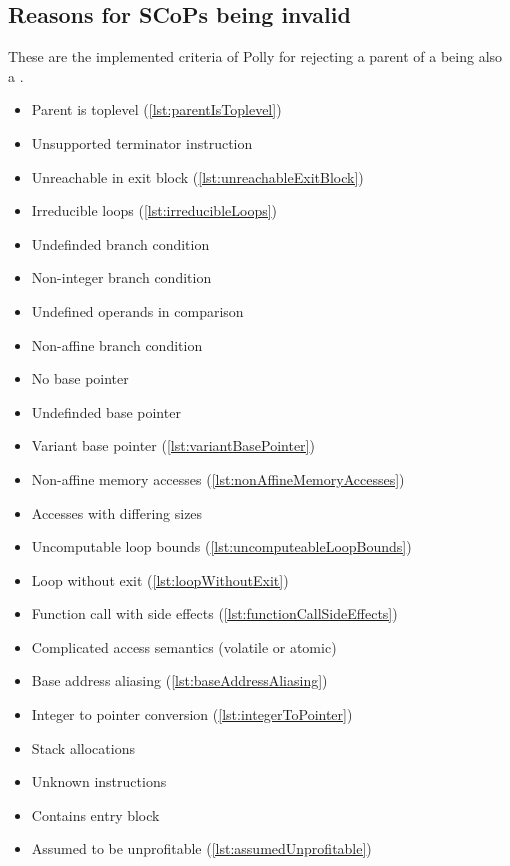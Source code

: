 \subsection{Reasons for SCoPs being invalid}
These are the implemented criteria of Polly for rejecting a parent of a \scop being also a \scop.
\begin{itemize}
    \item Parent is toplevel (\autoref{lst:parentIsToplevel})
    \item Unsupported terminator instruction
    \item Unreachable in exit block (\autoref{lst:unreachableExitBlock})
    \item Irreducible loops (\autoref{lst:irreducibleLoops})
    \item Undefinded branch condition
    \item Non-integer branch condition
    \item Undefined operands in comparison
    \item Non-affine branch condition
    \item No base pointer
    \item Undefinded base pointer
    \item Variant base pointer (\autoref{lst:variantBasePointer})
    \item Non-affine memory accesses (\autoref{lst:nonAffineMemoryAccesses})
    \item Accesses with differing sizes
    \item Uncomputable loop bounds (\autoref{lst:uncomputeableLoopBounds})
    \item Loop without exit (\autoref{lst:loopWithoutExit})
    \item Function call with side effects (\autoref{lst:functionCallSideEffects})
    \item Complicated access semantics (volatile or atomic)
    \item Base address aliasing (\autoref{lst:baseAddressAliasing})
    \item Integer to pointer conversion (\autoref{lst:integerToPointer})
    \item Stack allocations
    \item Unknown instructions
    \item Contains entry block
    \item Assumed to be unprofitable (\autoref{lst:assumedUnprofitable})
\end{itemize}


